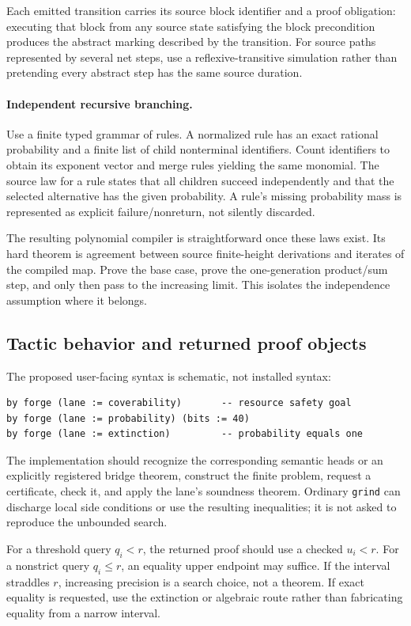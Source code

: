 \documentclass[11pt,a4paper]{article}
\theoremstyle{definition}\newtheorem{definition}[theorem]{Definition}
\theoremstyle{remark}\newtheorem{remark}[theorem]{Remark}
\newcommand{\code}[1]{\nolinkurl{#1}}
\begin{document}
Each emitted transition carries its source block identifier and a proof obligation: executing that block from any source state satisfying the block precondition produces the abstract marking described by the transition. For source paths represented by several net steps, use a reflexive-transitive simulation rather than pretending every abstract step has the same source duration.

\paragraph{Independent recursive branching.}
Use a finite typed grammar of rules. A normalized rule has an exact rational probability and a finite list of child nonterminal identifiers. Count identifiers to obtain its exponent vector and merge rules yielding the same monomial. The source law for a rule states that all children succeed independently and that the selected alternative has the given probability. A rule's missing probability mass is represented as explicit failure/nonreturn, not silently discarded.

The resulting polynomial compiler is straightforward once these laws exist. Its hard theorem is agreement between source finite-height derivations and iterates of the compiled map. Prove the base case, prove the one-generation product/sum step, and only then pass to the increasing limit. This isolates the independence assumption where it belongs.

\subsection{Tactic behavior and returned proof objects}
The proposed user-facing syntax is schematic, not installed syntax:
\begin{lstlisting}
by forge (lane := coverability)       -- resource safety goal
by forge (lane := probability) (bits := 40)
by forge (lane := extinction)         -- probability equals one
\end{lstlisting}
The implementation should recognize the corresponding semantic heads or an explicitly registered bridge theorem, construct the finite problem, request a certificate, check it, and apply the lane's soundness theorem. Ordinary \code{grind} can discharge local side conditions or use the resulting inequalities; it is not asked to reproduce the unbounded search.

For a threshold query $q_i<r$, the returned proof should use a checked $u_i<r$. For a nonstrict query $q_i\le r$, an equality upper endpoint may suffice. If the interval straddles $r$, increasing precision is a search choice, not a theorem. If exact equality is requested, use the extinction or algebraic route rather than fabricating equality from a narrow interval.
\end{document}
